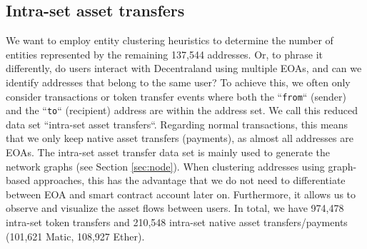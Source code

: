 \documentclass[12pt,a4paper,titlepage,oneside,english]{article}
\begin{document}
\subsection{Intra-set asset transfers}
\label{sec:intra-set}
We want to employ entity clustering heuristics to determine the number of entities represented by the remaining 137,544 addresses. Or, to phrase it differently, do users interact with Decentraland using multiple EOAs, and can we identify addresses that belong to the same user?
\newline
To achieve this, we often only consider transactions or token transfer events where both the ``\texttt{from}`` (sender) and the ``\texttt{to}`` (recipient) address are within the address set. We call this reduced data set ``intra-set asset transfers``. Regarding normal transactions, this means that we only keep native asset transfers (payments), as almost all addresses are EOAs. \newline
The intra-set asset transfer data set is mainly used to generate the network graphs (see Section \ref{sec:node}).
When clustering addresses using graph-based approaches, this has the advantage that we do not need to differentiate between EOA and smart contract account later on. Furthermore, it allows us to observe and visualize the asset flows between users. In total, we have 974,478 intra-set token transfers and 210,548 intra-set native asset transfers/payments (101,621 Matic, 108,927 Ether). 

\end{document}
